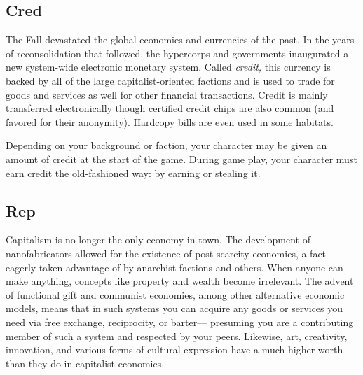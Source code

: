 \subsection{Cred}

The Fall devastated the global economies and currencies
of the past. In the years of reconsolidation
that followed, the hypercorps and governments 
inaugurated a new system-wide electronic monetary 
system. Called \textit{credit,} this currency is backed by all 
of the large capitalist-oriented factions and is used to 
trade for goods and services as well for other financial 
transactions. Credit is mainly transferred electronically
though certified credit chips are also common
(and favored for their anonymity). Hardcopy bills are 
even used in some habitats.

Depending on your background or faction, your 
character may be given an amount of credit at the 
start of the game. During game play, your character 
must earn credit the old-fashioned way: by earning 
or stealing it.

\subsection{Rep}

Capitalism is no longer the only economy in town. 
The development of nanofabricators allowed for the 
existence of post-scarcity economies, a fact eagerly 
taken advantage of by anarchist factions and others. 
When anyone can make anything, concepts like 
property and wealth become irrelevant. The advent 
of functional gift and communist economies, among 
other alternative economic models, means that in 
such systems you can acquire any goods or services 
you need via free exchange, reciprocity, or barter—
presuming you are a contributing member of such 
a system and respected by your peers. Likewise, art, 
creativity, innovation, and various forms of cultural 
expression have a much higher worth than they do in 
capitalist economies.

